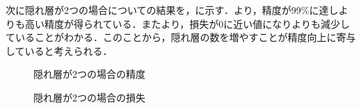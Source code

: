 \documentclass{eithesis}
\begin{document}
	次に隠れ層が2つの場合についての結果を，に示す．より，精度が99\%に達しよりも高い精度が得られている．またより，損失が0に近い値になりよりも減少していることがわかる．このことから，隠れ層の数を増やすことが精度向上に寄与していると考えられる．
	\begin{figure}[htbp]
		\centering
		\caption{隠れ層が2つの場合の精度}
		\label{fig_hidden2_acc}
	\end{figure}
	\begin{figure}[htbp]
		\centering
		\caption{隠れ層が2つの場合の損失}
		\label{fig_hidden2_loss}
	\end{figure}
\end{document}
